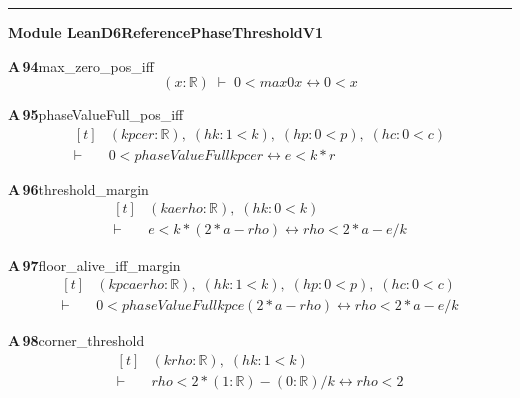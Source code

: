 \documentclass[conference]{IEEEtran}
\theoremstyle{definition}
\newcommand{\lean}[1]{\textsf{\footnotesize #1}}
\begin{document}
\vspace{4pt}\noindent\rule{\columnwidth}{0.4pt}\par\vspace{2pt}
\noindent\textbf{Module \lean{LeanD6ReferencePhaseThresholdV1}}\par\vspace{3pt}

\noindent\textbf{A\,94}\quad\lean{max\_zero\_pos\_iff}
{\footnotesize\[ (\mathit{x} : \mathbb{R} ) \;\vdash\; 0 < \mathit{max} 0 \mathit{x} \leftrightarrow 0 < \mathit{x} \]}

\noindent\textbf{A\,95}\quad\lean{phaseValueFull\_pos\_iff}
{\footnotesize\[ \begin{aligned}[t]
&(\mathit{k} \mathit{p} \mathit{c} \mathit{e} \mathit{r} : \mathbb{R} ),\; (\mathit{hk} : 1 < \mathit{k}),\; (\mathit{hp} : 0 < \mathit{p}),\; (\mathit{hc} : 0 < \mathit{c})\\
\vdash\;&0 < \mathit{phaseValueFull} \mathit{k} \mathit{p} \mathit{c} \mathit{e} \mathit{r} \leftrightarrow \mathit{e} < \mathit{k}*\mathit{r}
\end{aligned} \]}

\noindent\textbf{A\,96}\quad\lean{threshold\_margin}
{\footnotesize\[ \begin{aligned}[t]
&(\mathit{k} \mathit{a} \mathit{e} \mathit{rho} : \mathbb{R} ),\; (\mathit{hk} : 0 < \mathit{k})\\
\vdash\;&\mathit{e} < \mathit{k}*(2*\mathit{a}-\mathit{rho}) \leftrightarrow \mathit{rho} < 2*\mathit{a}-\mathit{e}/\mathit{k}
\end{aligned} \]}

\noindent\textbf{A\,97}\quad\lean{floor\_alive\_iff\_margin}
{\footnotesize\[ \begin{aligned}[t]
&(\mathit{k} \mathit{p} \mathit{c} \mathit{a} \mathit{e} \mathit{rho} : \mathbb{R} ),\; (\mathit{hk} : 1 < \mathit{k}),\; (\mathit{hp} : 0 < \mathit{p}),\; (\mathit{hc} : 0 < \mathit{c})\\
\vdash\;&0 < \mathit{phaseValueFull} \mathit{k} \mathit{p} \mathit{c} \mathit{e} (2*\mathit{a}-\mathit{rho}) \leftrightarrow \mathit{rho} < 2*\mathit{a}-\mathit{e}/\mathit{k}
\end{aligned} \]}

\noindent\textbf{A\,98}\quad\lean{corner\_threshold}
{\footnotesize\[ \begin{aligned}[t]
&(\mathit{k} \mathit{rho} : \mathbb{R} ),\; (\mathit{hk} : 1 < \mathit{k})\\
\vdash\;&\mathit{rho} < 2*(1:\mathbb{R} )-(0:\mathbb{R} )/\mathit{k} \leftrightarrow \mathit{rho} < 2
\end{aligned} \]}
\end{document}
